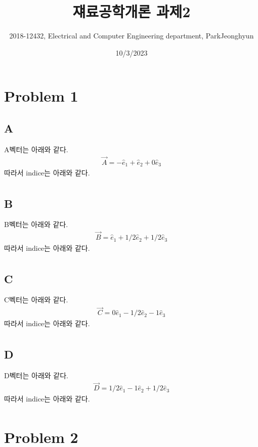 \documentclass[a4paper]{oblivoir}
\title{쟤료공학개론 과제2}
\author{2018-12432, Electrical and Computer Engineering department, ParkJeonghyun}
\date{10/3/2023}
\begin{document}
\maketitle
\section{Problem 1}
\subsection{A}
A벡터는 아래와 같다.
\begin{align}
	\vec{A} = -\hat{e}_{1}  + \hat{e}_{2} + 0 \hat{e}_{3}
\end{align}
따라서 indice는 아래와 같다.
\begin{align}
	[\bar{1}10]
\end{align}

\subsection{B}
B벡터는 아래와 같다.
\begin{align}
	\vec{B} = \hat{e}_{1}  + 1/2 \hat{e}_{2} + 1/2 \hat{e}_{3}
\end{align}
따라서 indice는 아래와 같다.
\begin{align}
	[211]
\end{align}

\subsection{C}
C벡터는 아래와 같다.
\begin{align}
	\vec{C} = 0\hat{e}_{1}  - 1/2 \hat{e}_{2} - 1 \hat{e}_{3}
\end{align}
따라서 indice는 아래와 같다.
\begin{align}
	[0\bar{1}\bar{2}]
\end{align}

\subsection{D}
D벡터는 아래와 같다.
\begin{align}
	\vec{D} = 1/2\hat{e}_{1}  - 1 \hat{e}_{2} + 1/2 \hat{e}_{3}
\end{align}
따라서 indice는 아래와 같다.
\begin{align}
	[1\bar{2}1]
\end{align}

\section{Problem 2}
\end{document}
